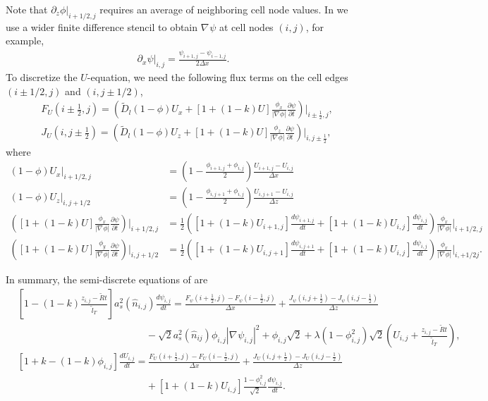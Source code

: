 \documentclass[final,times]{elsarticle}
\numberwithin{equation}{section}
\newcommand{\T}[1]{\tilde{#1}}
\newcommand{\grad}[1]{\nabla_{#1}}
\begin{document}
Note that  $\partial_z \phi |_{i+1/2,j}$ requires  an average of neighboring cell node values. In  we use a wider finite difference stencil to obtain $\grad{} \psi$ at cell nodes $(i,j)$, for example,
\begin{align}
\partial_x \psi \big|_{i,j} = \frac{ \psi_{i+1,j} - \psi_{i-1,j}}{2\Delta x}.
\end{align} 
To discretize the $U$-equation, we need the following flux terms on the cell edges $(i \pm 1/2,j)$ and $(i,j \pm 1/2)$,
\begin{align}
& F_{U}(i \pm \frac{1}{2}, j ) = \left(  \T{D}_l (1-\phi) U_x + [1+(1-k)U]  \frac{\phi_x}{ |\grad{} \phi | } \frac{\partial \psi}{\partial t}   \right) \bigg|_{i \pm \frac{1}{2}, j}, \\
& J_{U}(i , j \pm \frac{1}{2}) = \left(  \T{D}_l (1-\phi) U_z + [1+(1-k)U]  \frac{\phi_z}{ |\grad{} \phi | } \frac{\partial \psi}{\partial t}   \right) \bigg|_{i, j \pm \frac{1}{2}}, 
\end{align}
where 
\begin{align}
  (1-\phi) U_x \bigg|_{i+1/2,j} &= \left( 1- \frac{\phi_{i+1,j} + \phi_{i,j}}{2} \right) \frac{U_{i+1,j}-U_{i,j}}{\Delta x}\\
  (1-\phi) U_z \bigg|_{i,j+1/2} &= \left( 1- \frac{\phi_{i,j+1} + \phi_{i,j}}{2} \right) \frac{U_{i,j+1}-U_{i,j}}{\Delta z}\\
  \left( [1+(1-k)U]  \frac{\phi_x}{ |\grad{} \phi | } \frac{\partial \psi}{\partial t}  \right) \Bigg|_{i+1/2,j}  &=  \frac{1}{2}\left( [1+(1-k)U_{i+1,j}] \frac{d\psi_{i+1,j}}{dt}  +[1+(1-k)U_{i,j}]\frac{d\psi_{i,j}}{dt} \right) \frac{\phi_x}{ |\grad{} \phi | }\bigg|_{i+1/2,j}  \\
 \left( [1+(1-k)U]  \frac{\phi_y}{ |\grad{} \phi | } \frac{\partial \psi}{\partial t}  \right) \Bigg|_{i,j+1/2} &= \frac{1}{2}\left( [1+(1-k)U_{i,j+1}]\frac{d\psi_{i,j+1}}{dt} +[1+(1-k)U_{i,j}] \frac{d\psi_{i,j}}{dt}  \right)  \frac{\phi_x}{ |\grad{} \phi | }\bigg|_{i,+1/2j}  .
\end{align}

In summary, the semi-discrete equations of  are 
\begin{align}
& \left[ 1- (1-k) \frac{z_{i,j} - \tilde{R} t}{\tilde{l}_T} \right] a^2_s( \hat{n}_{i,j}) \frac{d \psi_{i,j}}{dt} = \frac{F_{\psi}(i+\frac{1}{2}, j) - F_{\psi}(i-\frac{1}{2},j)}{\Delta x} + \frac{J_{\psi}(i,j+\frac{1}{2})-J_{\psi}(i,j-\frac{1}{2})}{\Delta z} \nonumber \\
& \hspace{13em} - \sqrt{2} a^2_s(\hat{n}_{ij}) \phi_{i,j} |\grad{} \psi_{i,j}|^2 + \phi_{i,j} \sqrt{2} + \lambda \left(1 - \phi_{i,j}^2 \right) \sqrt{2} \left( U_{i,j} + \frac{z_{i,j} - \tilde{R} t }{\tilde{l}_T} \right), \label{eq:psi_discrete} \\
& [1+k-(1-k)\phi_{i,j}] \frac{dU_{i,j}}{dt} = \frac{F_{U}(i+\frac{1}{2}, j) - F_{U}(i-\frac{1}{2},j)}{\Delta x} + \frac{J_{U}(i,j+\frac{1}{2})-J_{U}(i,j-\frac{1}{2})}{\Delta z} \nonumber \\
&\hspace{13em} + [1+(1-k) U_{i,j}] \frac{1-\phi^2_{i,j}}{\sqrt{2}} \frac{d \psi_{i,j}}{dt}. \label{eq:saturation_discrete}
\end{align}
\end{document}

